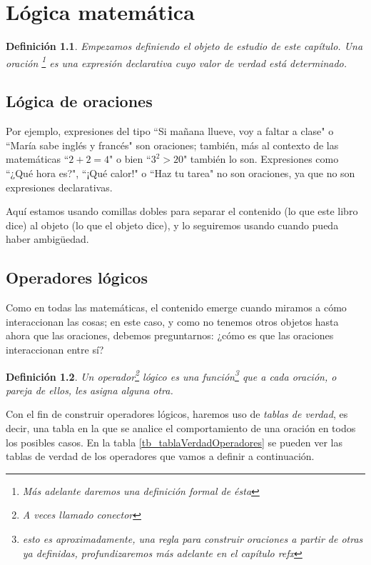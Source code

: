 \documentclass{book}
\newtheorem{df}{Definición}[chapter]
\begin{document}
\chapter{Lógica matemática}
\begin{df}
	Empezamos definiendo el objeto de estudio de este capítulo.
	Una \emph{oración}
		\footnote{Más adelante daremos una definición formal de ésta} %
		es una expresión declarativa cuyo valor de verdad está determinado.
\end{df}

\section{Lógica de oraciones}
Por ejemplo, expresiones del tipo ``Si mañana llueve, voy a faltar a clase" o ``María sabe inglés y francés" son oraciones; también, más al contexto de las matemáticas ``$2+2=4$" o bien ``$3^2 > 20$" también lo son.
Expresiones como ``¿Qué hora es?", ``¡Qué calor!" o ``Haz tu tarea" no son oraciones, ya que no son expresiones declarativas.

Aquí estamos usando comillas dobles para separar el contenido (lo que este libro dice) al objeto (lo que el objeto dice), y lo seguiremos usando cuando pueda haber ambigüedad.

\section{Operadores lógicos}

Como en todas las matemáticas, el contenido emerge cuando miramos a cómo interaccionan las cosas; en este caso, y como no tenemos otros objetos hasta ahora que las oraciones, debemos preguntarnos: ¿cómo es que las oraciones interaccionan entre sí?

\begin{df}
	Un operador\footnote{A veces llamado conector} lógico es una función\footnote %
	{esto es aproximadamente, una regla para construir oraciones a partir de otras ya definidas, profundizaremos más adelante en el capítulo refx}
	que a cada oración, o pareja de ellos, les asigna alguna otra.
\end{df}

Con el fin de construir operadores lógicos, haremos uso de \emph{tablas de verdad}, es decir, una tabla en la que se analice el comportamiento de una oración en todos los posibles casos. En la tabla \ref{tb_tablaVerdadOperadores} se pueden ver las tablas de verdad de los operadores que vamos a definir a continuación.
\end{document}
